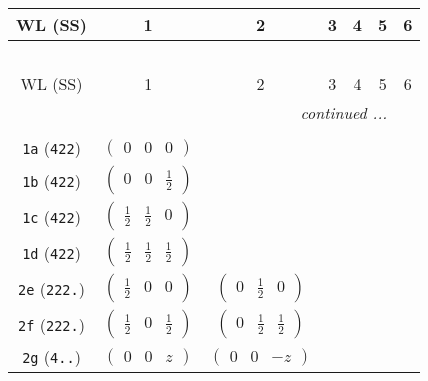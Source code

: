 \documentclass[fleqn,9pt,landscape]{jsarticle}
\begin{document}
\begin{center}
\renewcommand{\arraystretch}{1.2}
\begin{longtable}{ccccccc}
 \hline \hline
WL (SS) & 1 & 2 & 3 & 4 & 5 & 6 \\ \hline \endfirsthead

\multicolumn{6}{l}{\tablename\ \thetable{}} \\
 \hline \hline
WL (SS) & 1 & 2 & 3 & 4 & 5 & 6 \\ \hline \endhead

 \hline \hline
\multicolumn{6}{r}{\footnotesize\it continued ...} \\ \endfoot

 \hline \hline
\multicolumn{6}{r}{} \\ \endlastfoot

{\tt 1a} ({\tt 422}) & $ \begin{pmatrix} 0 & 0 & 0 \end{pmatrix} $ & $  $ & $  $ & $  $ & $  $ & $  $ \\ \hline
{\tt 1b} ({\tt 422}) & $ \begin{pmatrix} 0 & 0 & \frac{1}{2} \end{pmatrix} $ & $  $ & $  $ & $  $ & $  $ & $  $ \\ \hline
{\tt 1c} ({\tt 422}) & $ \begin{pmatrix} \frac{1}{2} & \frac{1}{2} & 0 \end{pmatrix} $ & $  $ & $  $ & $  $ & $  $ & $  $ \\ \hline
{\tt 1d} ({\tt 422}) & $ \begin{pmatrix} \frac{1}{2} & \frac{1}{2} & \frac{1}{2} \end{pmatrix} $ & $  $ & $  $ & $  $ & $  $ & $  $ \\ \hline
{\tt 2e} ({\tt 222.}) & $ \begin{pmatrix} \frac{1}{2} & 0 & 0 \end{pmatrix} $ & $ \begin{pmatrix} 0 & \frac{1}{2} & 0 \end{pmatrix} $ & $  $ & $  $ & $  $ & $  $ \\ \hline
{\tt 2f} ({\tt 222.}) & $ \begin{pmatrix} \frac{1}{2} & 0 & \frac{1}{2} \end{pmatrix} $ & $ \begin{pmatrix} 0 & \frac{1}{2} & \frac{1}{2} \end{pmatrix} $ & $  $ & $  $ & $  $ & $  $ \\ \hline
{\tt 2g} ({\tt 4..}) & $ \begin{pmatrix} 0 & 0 & z \end{pmatrix} $ & $ \begin{pmatrix} 0 & 0 & - z \end{pmatrix} $ & $  $ & $  $ & $  $ & $  $ \\ \hline

\end{longtable}
\end{center}
\end{document}
